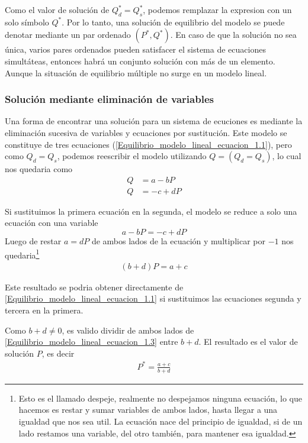 Como el valor de solución de \(Q_d^\ast = Q_s^\ast\), podemos remplazar la expresion con un solo símbolo \(Q^\ast\). Por lo tanto, una solución de equilibrio del modelo se puede denotar mediante un par ordenado \((P^\ast,Q^\ast)\). En caso de que la solución no sea única, varios pares ordenados pueden satisfacer el sistema de ecuaciones simultáteas, entonces habrá un conjunto solución con más de un elemento. Aunque la situación de equilibrio múltiple no surge en un modelo lineal.


\subsubsection{Solución mediante eliminación de variables}

Una forma de encontrar una solución para un sistema de ecuciones es mediante la eliminación sucesiva de variables y ecuaciones por sustitución. Este modelo se constituye de tres ecuaciones (\ref{Equilibrio_modelo_lineal_ecuacion_1.1}), pero como \(Q_d = Q_s\), podemos reescribir el modelo utilizando \(Q=(Q_d=Q_s)\), lo cual nos quedaria como
\begin{equation}
    \label{Equilibrio_modelo_lineal_ecuacion_1.2}
    \begin{aligned}
    Q &= a-bP \\
    Q &= -c+dP
    \end{aligned}
\end{equation} 

Si sustituimos la primera ecuación en la segunda, el modelo se reduce a solo una ecuación con una variable
\[
a-bP = -c+dP 
\]
Luego de restar \(a=dP\) de ambos lados de la ecuación y multiplicar por \(-1\) nos quedaria\footnote{Esto es el llamado despeje, realmente no despejamos ninguna ecuación, lo que hacemos es restar y sumar variables de ambos lados, hasta llegar a una igualdad que nos sea util. La ecuación nace del principio de igualdad, si de un lado restamos una variable, del otro también, para mantener esa igualdad.} 
\begin{equation}
    \label{Equilibrio_modelo_lineal_ecuacion_1.3}
    \begin{aligned}
    (b+d)P = a+c
    \end{aligned}
\end{equation}

Este resultado se podria obtener directamente de \ref{Equilibrio_modelo_lineal_ecuacion_1.1} si sustituimos las ecuaciones segunda y tercera en la primera.

Como \(b+d \neq 0\), es valido dividir de ambos lados de \ref{Equilibrio_modelo_lineal_ecuacion_1.3} entre \(b+d\). El resultado es el valor de solución \(P\), es decir 
\begin{equation}
    \label{Equilibrio_modelo_lineal_ecuacion_1.4}
    \begin{aligned}
    P^\ast=\frac{a+c}{b+d}
    \end{aligned}
\end{equation} 

